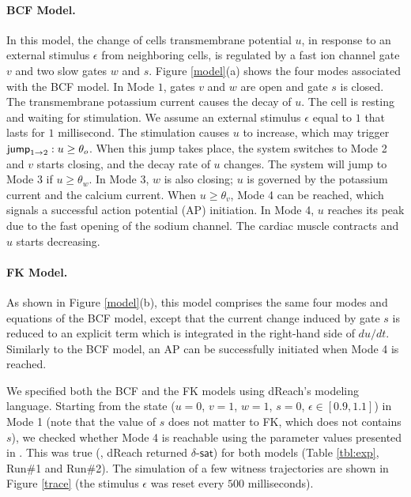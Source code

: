 \paragraph{BCF Model.}
In this model, the change of cells transmembrane potential $u$, in response to an external stimulus $\epsilon$ from neighboring cells, is regulated by a fast ion channel gate $v$ and two slow gates $w$ and $s$.
Figure \ref{model}(a) shows the four modes associated with the BCF model. In Mode $1$, gates $v$ and $w$ are open and gate $s$ is closed. The transmembrane potassium current causes the decay of $u$. The cell is resting and waiting for stimulation. We assume an external stimulus $\epsilon$ equal to $1$ that lasts for $1$ millisecond. The stimulation causes $u$ to increase, which may trigger $\mathsf{jump}_{1 \rightarrow 2}: u \geq \theta_o$. When this jump takes place, the system switches to Mode 2 and $v$ starts closing, and the decay rate of $u$ changes. The system will jump to Mode 3 if $u \geq \theta_w$. In Mode 3, $w$ is also closing; $u$ is governed by the potassium current and the calcium current. When $u \geq \theta_v$, Mode 4 can be reached, which signals a successful action potential (AP) initiation. In Mode 4, $u$ reaches its peak due to the fast opening of the sodium channel. The cardiac muscle contracts and $u$ starts decreasing.

\paragraph{FK Model.}
As shown in Figure \ref{model}(b), this model comprises the same four modes and equations of the BCF model, except that the current change induced by gate $s$ is reduced to an explicit term which is integrated in the right-hand side of $du/dt$. Similarly to the BCF model, an AP can be successfully initiated when Mode 4 is reached.

\vspace{1ex}
We specified both the BCF and the FK models using dReach's modeling language. Starting from the state ($u = 0$, $v = 1$, $w = 1$, $s = 0$, $\epsilon \in [0.9, 1.1]$) in Mode 1 (note that the value of $s$ does not matter to FK, which does not contains $s$), we checked whether Mode 4 is reachable using the parameter values presented in \cite{orovio08}. This was true (\ie, dReach returned $\delta$-$\mathsf{sat}$) for both models (Table \ref{tbl:exp}, Run\#1 and Run\#2).
The simulation of a few witness trajectories are shown in Figure \ref{trace} (the stimulus $\epsilon$ was reset every $500$ milliseconds).


